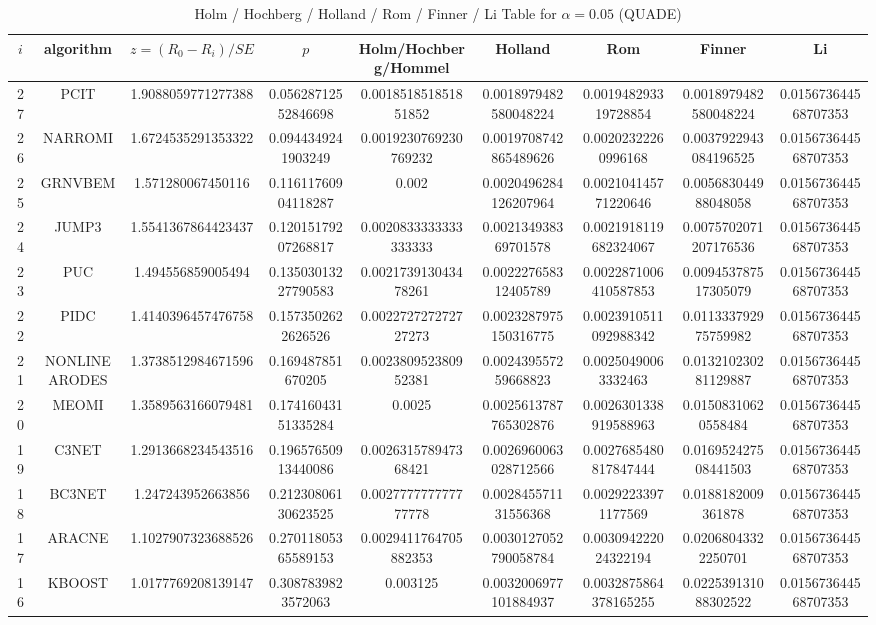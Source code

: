 \documentclass[a4paper,10pt]{article}
\begin{document}
\begin{landscape}
\begin{table}[!htp]
\centering\scriptsize
\caption{Holm / Hochberg / Holland / Rom / Finner / Li Table for $\alpha=0.05$ (QUADE)}
\begin{tabular}{ccccccccc}
$i$&algorithm&$z=(R_0 - R_i)/SE$&$p$&Holm/Hochberg/Hommel&Holland&Rom&Finner&Li\\
\hline
27&PCIT&1.9088059771277388&0.05628712552846698&0.001851851851851852&0.0018979482580048224&0.001948293319728854&0.0018979482580048224&0.015673644568707353\\
26&NARROMI&1.6724535291353322&0.0944349241903249&0.0019230769230769232&0.0019708742865489626&0.00202322260996168&0.0037922943084196525&0.015673644568707353\\
25&GRNVBEM&1.571280067450116&0.11611760904118287&0.002&0.0020496284126207964&0.002104145771220646&0.005683044988048058&0.015673644568707353\\
24&JUMP3&1.5541367864423437&0.12015179207268817&0.0020833333333333333&0.002134938369701578&0.0021918119682324067&0.0075702071207176536&0.015673644568707353\\
23&PUC&1.494556859005494&0.13503013227790583&0.002173913043478261&0.002227658312405789&0.0022871006410587853&0.009453787517305079&0.015673644568707353\\
22&PIDC&1.4140396457476758&0.1573502622626526&0.002272727272727273&0.0023287975150316775&0.0023910511092988342&0.011333792975759982&0.015673644568707353\\
21&NONLINEARODES&1.3738512984671596&0.169487851670205&0.002380952380952381&0.002439557259668823&0.00250490063332463&0.013210230281129887&0.015673644568707353\\
20&MEOMI&1.3589563166079481&0.17416043151335284&0.0025&0.0025613787765302876&0.0026301338919588963&0.01508310620558484&0.015673644568707353\\
19&C3NET&1.2913668234543516&0.19657650913440086&0.002631578947368421&0.0026960063028712566&0.0027685480817847444&0.016952427508441503&0.015673644568707353\\
18&BC3NET&1.247243952663856&0.21230806130623525&0.002777777777777778&0.002845571131556368&0.00292233971177569&0.0188182009361878&0.015673644568707353\\
17&ARACNE&1.1027907323688526&0.27011805365589153&0.0029411764705882353&0.0030127052790058784&0.003094222024322194&0.02068043322250701&0.015673644568707353\\
16&KBOOST&1.0177769208139147&0.3087839823572063&0.003125&0.0032006977101884937&0.0032875864378165255&0.022539131088302522&0.015673644568707353\\

\end{tabular}
\end{table}
\end{landscape}
\end{document}
